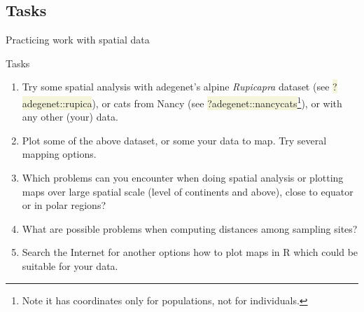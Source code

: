 \documentclass[compress, xelatex, 11pt, xcolor=svgnames, aspectratio=169,
	hyperref={
		bookmarks=true,
		unicode=true,
		colorlinks=true,
		pdftitle={Molecular data in R},
		plainpages=false,
		pdfauthor={Vojtech Zeisek},
		pdfsubject={Course about phylogeny and evolution in R},
		pdfcreator={XeLaTeX},
		pdfkeywords={R, evolution, phylogeny, molecular data},
		linkcolor=Crimson, %
		anchorcolor=Magenta, %
		citecolor=Magenta, %
		filecolor=Magenta, %
		menucolor=Magenta, %
		urlcolor=DodgerBlue, %
		},
	url={hyphens, lowtilde} %
	]{beamer}
\renewcommand{\texttt}[1]{\colorbox{Beige}{{\ttfamily #1}}}
\begin{document}
% 

\subsection{Tasks}

\begin{frame}{Practicing work with spatial data}
	\begin{exampleblock}{Tasks}
		\begin{enumerate}
			\item Try some spatial analysis with adegenet's alpine \textit{Rupicapra} dataset (see \texttt{?adegenet::rupica}), or cats from Nancy (see \texttt{?adegenet::nancycats}\footnote{Note it has coordinates only for populations, not for individuals.}), or with any other (your) data.
			\item Plot some of the above dataset, or some your data to map. Try several mapping options.
			\item Which problems can you encounter when doing spatial analysis or plotting maps over large spatial scale (level of continents and above), close to equator or in polar regions?
			\item What are possible problems when computing distances among sampling sites?
			\item Search the Internet for another options how to plot maps in R which could be suitable for your data.
		\end{enumerate}
	\end{exampleblock}
\end{frame}
\end{document}
